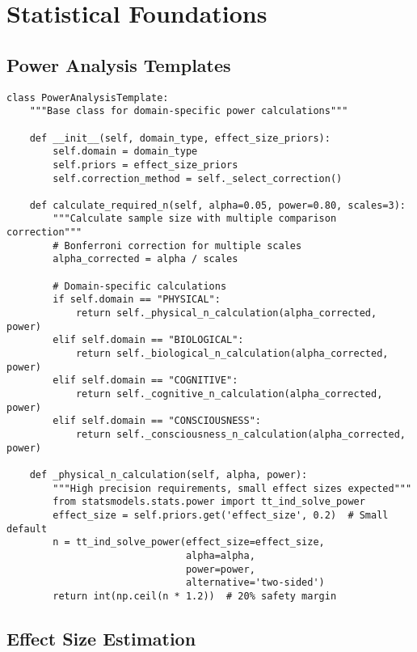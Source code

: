 \documentclass[12pt,oneside]{memoir}
\theoremstyle{plain}
\theoremstyle{definition}
\theoremstyle{remark}
\begin{document}
\chapter{Statistical Foundations}

\section{Power Analysis Templates}

\begin{lstlisting}[caption={Domain-Specific Power Analysis},label={lst:power}]
class PowerAnalysisTemplate:
    """Base class for domain-specific power calculations"""
    
    def __init__(self, domain_type, effect_size_priors):
        self.domain = domain_type
        self.priors = effect_size_priors
        self.correction_method = self._select_correction()
    
    def calculate_required_n(self, alpha=0.05, power=0.80, scales=3):
        """Calculate sample size with multiple comparison correction"""
        # Bonferroni correction for multiple scales
        alpha_corrected = alpha / scales
        
        # Domain-specific calculations
        if self.domain == "PHYSICAL":
            return self._physical_n_calculation(alpha_corrected, power)
        elif self.domain == "BIOLOGICAL":
            return self._biological_n_calculation(alpha_corrected, power)
        elif self.domain == "COGNITIVE":
            return self._cognitive_n_calculation(alpha_corrected, power)
        elif self.domain == "CONSCIOUSNESS":
            return self._consciousness_n_calculation(alpha_corrected, power)
    
    def _physical_n_calculation(self, alpha, power):
        """High precision requirements, small effect sizes expected"""
        from statsmodels.stats.power import tt_ind_solve_power
        effect_size = self.priors.get('effect_size', 0.2)  # Small default
        n = tt_ind_solve_power(effect_size=effect_size, 
                               alpha=alpha, 
                               power=power, 
                               alternative='two-sided')
        return int(np.ceil(n * 1.2))  # 20% safety margin
\end{lstlisting}

\section{Effect Size Estimation}
\end{document}
